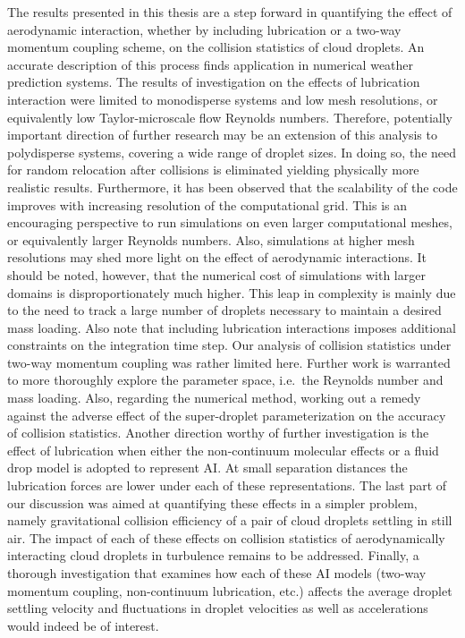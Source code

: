 \documentclass[../thesis.tex]{subfiles}
\begin{document}
The results presented in this thesis are a step forward in quantifying the effect of aerodynamic interaction, whether by including lubrication or a two-way momentum coupling scheme, on the collision statistics of cloud droplets. An accurate description of this process finds application in numerical weather prediction systems. The results of investigation on the effects of lubrication interaction were limited to monodisperse systems and low mesh resolutions, or equivalently low Taylor-microscale flow Reynolds numbers. Therefore, potentially important direction of further research may be an extension of this analysis to polydisperse systems, covering a wide range of droplet sizes. In doing so, the need for random relocation after collisions is eliminated yielding physically more realistic results. Furthermore, it has been observed that the scalability of the code improves with increasing resolution of the computational grid. This is an encouraging perspective to run simulations on even larger computational meshes, or equivalently larger Reynolds numbers. Also, simulations at higher mesh resolutions may shed more light on the effect of aerodynamic interactions. It should be noted, however, that the numerical cost of simulations with larger domains is disproportionately much higher. This leap in complexity is mainly due to the need to track a large number of droplets necessary to maintain a desired mass loading. Also note that including lubrication interactions imposes additional constraints on the integration time step. Our analysis of collision statistics under two-way momentum coupling was rather limited here. Further work is warranted to more thoroughly explore the parameter space, i.e.\ the Reynolds number and mass loading. Also, regarding the numerical method, working out a remedy against the adverse effect of the super-droplet parameterization on the accuracy of collision statistics. Another direction worthy of further investigation is the effect of lubrication when either the non-continuum molecular effects or a fluid drop model is adopted to represent AI. At small separation distances the lubrication forces are lower under each of these representations. The last part of our discussion was aimed at quantifying these effects in a simpler problem, namely gravitational collision efficiency of a pair of cloud droplets settling in still air. The impact of each of these effects on collision statistics of aerodynamically interacting cloud droplets in turbulence remains to be addressed. Finally, a thorough investigation that examines how each of these AI models (two-way momentum coupling, non-continuum lubrication, etc.) affects the average droplet settling velocity and fluctuations in droplet velocities as well as accelerations would indeed be of interest.

%
%
\newpage
\end{document}
